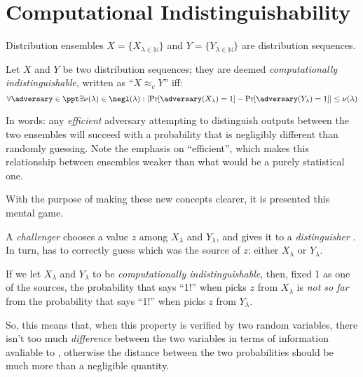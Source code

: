 \section{Computational Indistinguishability}

Distribution ensembles $X = \{X_{\lambda \in \mathbb{N}}\}$ and $Y = \{Y_{\lambda \in \mathbb{N}}\}$ are distribution sequences.

\begin{definition}
    Let $X$ and $Y$ be two distribution sequences; they are deemed \emph{computationally indistinguishable}, written as ``$X \approx_{c} Y$'' iff:
    \[
        \forall \adversary \in \ppt \exists \nu(\lambda) \in \negl(\lambda) : \left|\Pr[\adversary(X_\lambda) = 1] - \Pr[\adversary(Y_\lambda) = 1]\right| \leq \nu(\lambda) 
    \]
\end{definition}

In words: any \emph{efficient} adversary attempting to distinguish outputs between the two ensembles will succeed with a probability that is negligibly different than randomly guessing. Note the emphasis on ``efficient'', which makes this relationship between ensembles weaker than what would be a purely statistical one.

With the purpose of making these new concepts clearer, it is presented this mental game.


A \emph{challenger} \challenger{} chooses a value $z$ among $X_\lambda$ and $Y_\lambda$, and gives it to a \emph{distinguisher} \distinguisher{}. In turn, \distinguisher{} has to correctly guess which was the source of $z$: either $X_\lambda$ or $Y_\lambda$. 

If we let $X_\lambda$ and $Y_\lambda$ to be \emph{computationally indistinguishable}, then, fixed 1 as one of the sources, the probability that \distinguisher{} says ``1!'' when \challenger{} picks $z$ from $X_\lambda$ is \emph{not so far} from the probability that \distinguisher{} says ``1!'' when \challenger{} picks $z$ from $Y_\lambda$.

So, this means that, when this property is verified by two random variables, there isn't too much \textit{difference} between the two variables in terms of information avaliable to \distinguisher{}, otherwise the distance between the two probabilities should be much more than a negligible quantity.

